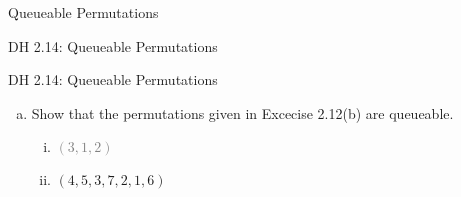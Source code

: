 \begin{frame}{}
  \centerline{\LARGE Queueable Permutations}

  \vspace{0.30cm}
\end{frame}

\begin{frame}{}
  \begin{exampleblock}{DH 2.14: Queueable Permutations}

  \end{exampleblock}
\end{frame}

\begin{frame}{}
  \begin{exampleblock}{DH 2.14: Queueable Permutations}
    \begin{enumerate}[(a)]
      \item Show that the permutations given in Excecise 2.12(b) are queueable.
	\begin{enumerate}[(i)]
	  \item \textcolor{gray}{$(3,1,2)$}
	  \item $(4,5,3,7,2,1,6)$
	\end{enumerate}
    \end{enumerate}
  \end{exampleblock}

  \vspace{0.30cm}
  \begin{columns}
    \pause
    \pause
  \end{columns}
\end{frame}

